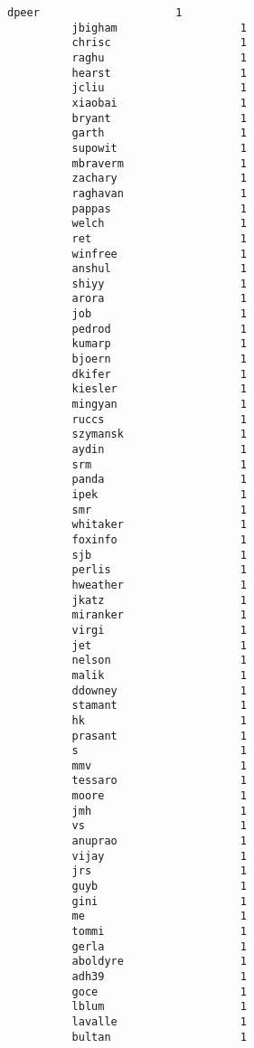 \documentclass[11pt]{article}
\begin{document}
\begin{Verbatim}[commandchars=\\\{\}]
          dpeer                     1
          jbigham                   1
          chrisc                    1
          raghu                     1
          hearst                    1
          jcliu                     1
          xiaobai                   1
          bryant                    1
          garth                     1
          supowit                   1
          mbraverm                  1
          zachary                   1
          raghavan                  1
          pappas                    1
          welch                     1
          ret                       1
          winfree                   1
          anshul                    1
          shiyy                     1
          arora                     1
          job                       1
          pedrod                    1
          kumarp                    1
          bjoern                    1
          dkifer                    1
          kiesler                   1
          mingyan                   1
          ruccs                     1
          szymansk                  1
          aydin                     1
          srm                       1
          panda                     1
          ipek                      1
          smr                       1
          whitaker                  1
          foxinfo                   1
          sjb                       1
          perlis                    1
          hweather                  1
          jkatz                     1
          miranker                  1
          virgi                     1
          jet                       1
          nelson                    1
          malik                     1
          ddowney                   1
          stamant                   1
          hk                        1
          prasant                   1
          s                         1
          mmv                       1
          tessaro                   1
          moore                     1
          jmh                       1
          vs                        1
          anuprao                   1
          vijay                     1
          jrs                       1
          guyb                      1
          gini                      1
          me                        1
          tommi                     1
          gerla                     1
          aboldyre                  1
          adh39                     1
          goce                      1
          lblum                     1
          lavalle                   1
          bultan                    1

\end{Verbatim}
\end{document}
